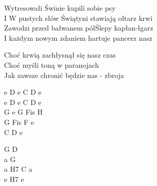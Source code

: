 \begin{text}
    Wytresowałi Świnie kupili sobie psy\\
    I W pustych słów Świątyni stawiają ołtarz krwi\\
    Zawodzi przed bałwanem półŚlepy kapłan-łgarz\\
    I każdym nowym zdaniem hartuje pancerz nasz

    \vin Choć krwią zachłysnął się nasz czas\\
    \vin Choć myśli toną w paranojach\\
    \vin Jak zawsze chronić będzie nas - zbroja

\end{text}
\begin{chord}
    e D e C D e\\
    e D e C D e\\
    G e G Fis H\\
    G Fis F e\\
	C D e

    G D\\
    a G\\
    a H7 C a\\
	e H7 e
\end{chord}